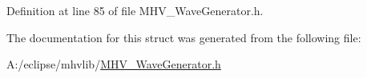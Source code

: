 \-Definition at line 85 of file \-M\-H\-V\-\_\-\-Wave\-Generator.\-h.



\-The documentation for this struct was generated from the following file\-:\begin{DoxyCompactItemize}
\item 
\-A\-:/eclipse/mhvlib/\hyperlink{_m_h_v___wave_generator_8h}{\-M\-H\-V\-\_\-\-Wave\-Generator.\-h}\end{DoxyCompactItemize}
